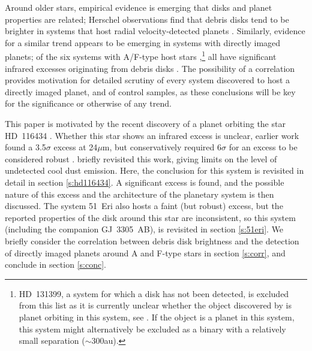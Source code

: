 \documentclass[a4paper,fleqn,usenatbib]{mnras}
\begin{document}
Around older stars, empirical evidence is emerging that disks and planet
properties are related; Herschel observations find that debris disks
tend to be brighter in systems that host radial velocity-detected
planets \citep{2013AAS...22114424B,2015ESS.....312014B}. Similarly,
evidence for a similar trend appears to be emerging in systems with
directly imaged planets; of the six systems with A/F-type host stars
\citep[HR~8799, Fomalhaut, $\beta$ Pictoris, HD~95086, HD~106906,
51~Eri,][]{2008Sci...322.1348M,2008Sci...322.1345K,2010Sci...329...57L,2013ApJ...772L..15R,2014ApJ...780L...4B,2015Sci...350...64M},\footnote{HD~131399,
  a system for which a disk has not been detected, is excluded from this
  list as it is currently unclear whether the object discovered by
  \citet{2016Sci...353..673W} is planet orbiting in this system, see
  \citet{2017arXiv170506851N}. If the object is a planet in this system,
  this system might alternatively be excluded as a binary with a
  relatively small separation ($\sim$300au).} all have significant
infrared excesses originating from debris disks
\citep{1984Sci...226.1421S,1985PASP...97..885A,2005ApJ...623..493C,2006ApJS..166..351C,2009ApJ...705..314S,2014ApJS..212...10P,2014A&A...565A..68R}. The
possibility of a correlation provides motivation for detailed scrutiny
of every system discovered to host a directly imaged planet, and of
control samples, as these conclusions will be key for the significance
or otherwise of any trend.

This paper is motivated by the recent discovery of a planet orbiting the
star HD~116434 \citep{2017arXiv170701413C}. Whether this star shows an
infrared excess is unclear, earlier work found a 3.5$\sigma$ excess at
24$\mu$m, but conservatively required 6$\sigma$ for an excess to be
considered robust
\citep{2012ApJ...756..133C}. \citet{2017arXiv170701413C} briefly
revisited this work, giving limits on the level of undetected cool dust
emission. Here, the conclusion for this system is revisited in detail in
section \ref{s:hd116434}. A significant excess is found, and the
possible nature of this excess and the architecture of the planetary
system is then discussed. The system 51~Eri also hosts a faint (but
robust) excess, but the reported properties of the disk around this star
are inconsistent, so this system (including the companion GJ~3305~AB),
is revisited in section \ref{s:51eri}. We briefly consider the
correlation between debris disk brightness and the detection of directly
imaged planets around A and F-type stars in section \ref{s:corr}, and
conclude in section \ref{s:conc}.
\end{document}
